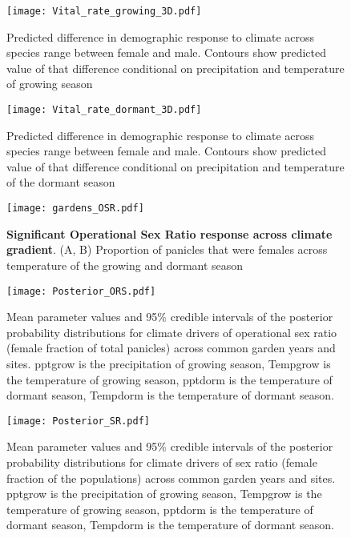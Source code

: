 \documentclass[9pt,twoside,lineno]{pnas-new}
\begin{document}
\begin{figure}
\centering
\texttt{[image: Vital\_rate\_growing\_3D.pdf]}
\caption{ Predicted difference in demographic response to climate across species range between female and male. Contours show predicted value of that difference conditional on precipitation and temperature of  growing season }
\label{Sup:vt_3D_grow}
\end{figure}

\begin{figure}
\centering
\texttt{[image: Vital\_rate\_dormant\_3D.pdf]}
\caption{ Predicted difference in demographic response to climate across species range between female and male. Contours show predicted value of that difference conditional on precipitation and temperature of the dormant  season }
\label{Sup:vt_3D_dorm}
\end{figure}

\begin{figure}
\centering
\texttt{[image: gardens\_OSR.pdf]}
\caption{\textbf{Significant Operational Sex Ratio response across climate gradient}.
			(A, B) Proportion of panicles that were females across  temperature of the growing and dormant season }
\label{Sup:gardens_OSR}
\end{figure}

\begin{figure}
\centering
\texttt{[image: Posterior\_ORS.pdf]}
\caption{Mean parameter values and 95\% credible intervals of the posterior probability distributions for climate drivers of operational sex ratio (female fraction of total panicles) across common garden years and sites. 
		pptgrow is  the precipitation of growing season,
		Tempgrow is the temperature of growing season,
		pptdorm is the temperature of dormant season,
		Tempdorm is the temperature of dormant season.}
\label{Sup:posterior_OSR}
\end{figure}

\begin{figure}
\centering
\texttt{[image: Posterior\_SR.pdf]}
\caption{Mean parameter values and 95\% credible intervals of the posterior probability distributions for climate drivers of sex ratio (female fraction of the populations) across common garden years and sites. 
			pptgrow is  the precipitation of growing season,
			Tempgrow is the temperature of growing season,
			pptdorm is the temperature of dormant season,
			Tempdorm is the temperature of dormant season.}
\label{Sup:posterior_SR}
\end{figure}
\end{document}
